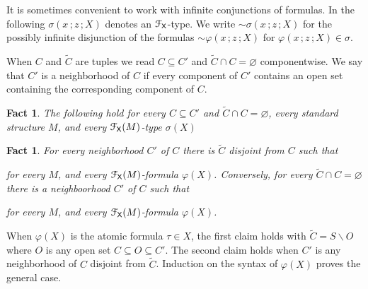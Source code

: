 \documentclass{amsproc}
\makeatletter
\newcounter{thm}
\theoremstyle{mio}
\newtheorem{fact}[thm]{Fact}\tcolorboxenvironment{fact}{mythm}
\providecommand{\proofNameStyle}{\bfseries}
\renewenvironment{proof}[1][\proofname]{\par
  \pushQED{\qed}%
  \normalfont%
  \trivlist
  \item[\hskip\labelsep
        \proofNameStyle
    #1\@addpunct{.}]\ignorespaces
}{%
  \popQED\endtrivlist\@endpefalse
}
\makeatother
\begin{document}
It is sometimes convenient to work with infinite conjunctions of formulas.
In the following $\sigma(x\,;z\,;X)$ denotes an ${\EuScript F}_{\sf X}$-type.
We write ${\sim}\sigma(x\,;z\,;X)$ for the possibly infinite disjunction of the formulas ${\sim}\varphi(x\,;z\,;X)$ for $\varphi(x\,;z\,;X)\in\sigma$.

When $C$ and $\tilde C$ are tuples we read $C\subseteq C'$ and $\tilde C\cap C=\varnothing$ componentwise.
We say that $C'$ is a neighborhood of $C$ if every component of $C'$ contains an open set containing the corresponding component of $C$.

\begin{fact}\label{fact_trivial}
  The following hold for every $C\subseteq C'$ and $\tilde C\cap C=\varnothing$, every standard structure $M$, and every ${\EuScript F}_{\sf X}(M)$-type $\sigma(X)$\smallskip

  \smallskip

  \smallskip
  
\end{fact}

\begin{fact}
  For every neighborhood $C'$ of $C$ there is $\tilde C$ disjoint from $C$ such that\smallskip
  
  \smallskip

  for every $M$, and every ${\EuScript F}_{\sf X}(M)$-formula $\varphi(X)$.
  Conversely, for every $\tilde C\cap C=\varnothing$ there is a neighboorhood $C'$ of $C$ such that

  \smallskip

  for every $M$, and every ${\EuScript F}_{\sf X}(M)$-formula $\varphi(X)$.
\end{fact}

\begin{proof}
  When $\varphi(X)$ is the atomic formula $\tau\in X$, the first claim holds with $\tilde C=S\smallsetminus O$ where $O$ is any open set $C\subseteq O\subseteq C'$.
  The second claim holds when $C'$ is any neighborhood of $C$ disjoint from $\tilde C$.
  Induction on the syntax of $\varphi(X)$ proves the general case.
\end{proof}
\end{document}
